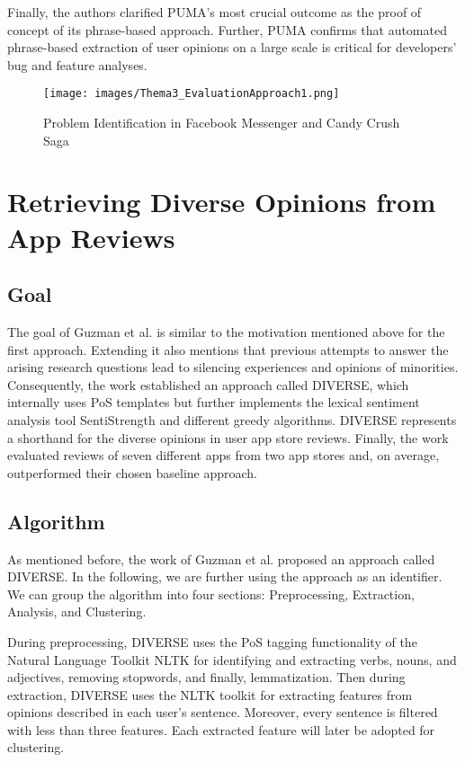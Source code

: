 Finally, the authors clarified PUMA’s most crucial outcome as the proof of concept of its phrase-based approach. Further, PUMA confirms that automated phrase-based extraction of user opinions on a large scale is critical for developers’ bug and feature analyses.

\begin{figure}
\centering
\texttt{[image: images/Thema3\_EvaluationApproach1.png]}
\caption{Problem Identification in Facebook Messenger and Candy Crush Saga \cite{Vu}}
\label{fig:evaluationApproach1}
\end{figure}


\chapter{Retrieving Diverse Opinions from App Reviews}
\label{chap:4}

\section{Goal}
The goal of Guzman et al. \cite{Guzman} is similar to the motivation mentioned above for the first approach. Extending it also mentions that previous attempts to answer the arising research questions lead to silencing experiences and opinions of minorities. Consequently, the work established an approach called DIVERSE, which internally uses PoS templates but further implements the lexical sentiment analysis tool SentiStrength and different greedy algorithms. DIVERSE represents a shorthand for the diverse opinions in user app store reviews. Finally, the work evaluated reviews of seven different apps from two app stores and, on average, outperformed their chosen baseline approach.

\section{Algorithm}
As mentioned before, the work of Guzman et al. proposed an approach called DIVERSE. In the following, we are further using the approach as an identifier. We can group the algorithm into four sections: Preprocessing, Extraction, Analysis, and Clustering.

During preprocessing, DIVERSE uses the PoS tagging functionality of the Natural Language Toolkit NLTK for identifying and extracting verbs, nouns, and adjectives, removing stopwords, and finally, lemmatization. Then during extraction, DIVERSE uses the NLTK toolkit for extracting features from opinions described in each user’s sentence. Moreover, every sentence is filtered with less than three features. Each extracted feature will later be adopted for clustering.


